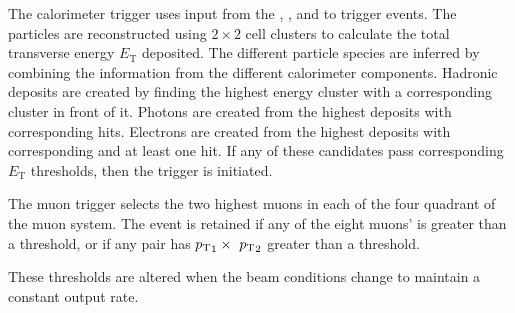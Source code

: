 The \lone calorimeter trigger uses input from the \spd, \presh, \ecal and \hcal to trigger events. The particles are reconstructed using $2\times2$ cell clusters to calculate the total transverse energy $E_{\text{T}}$ deposited. 
The different particle species are inferred by combining the information from the different calorimeter components.
Hadronic deposits are created by finding the highest energy \hcal cluster with a corresponding \ecal cluster in front of it.
Photons are created from the highest \ecal deposits with corresponding \presh hits. Electrons are created from the highest \ecal deposits with corresponding \presh and at least one \spd hit. 
If any of these candidates pass corresponding $E_{\text{T}}$ thresholds, then the trigger is initiated. 

The \lone muon trigger selects the two highest \pt muons in each of the four quadrant of the muon system. The event is retained if any of the eight muons' \pt is greater than a threshold, or if any pair has $\mbox{$p_{\mathrm{ T}}$}_{1} \times\ \mbox{$p_{\mathrm{ T}}$}_{2}$ greater than a threshold.

These thresholds are altered when the beam conditions change to maintain a constant \lone output rate.

